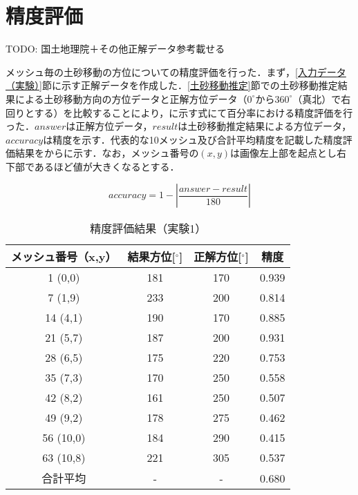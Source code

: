   \section{精度評価}
  TODO: 国土地理院＋その他正解データ参考載せる

    メッシュ毎の土砂移動の方位についての精度評価を行った．まず，\ref{入力データ（実験）}節に示す正解データを作成した．\ref{土砂移動推定}節での土砂移動推定結果による土砂移動方向の方位データと正解方位データ（$0^\circ$から$360^\circ$（真北）で右回りとする）を比較することにより，に示す式にて百分率における精度評価を行った．$answer$は正解方位データ，$result$は土砂移動推定結果による方位データ，$accuracy$は精度を示す．代表的な10メッシュ及び合計平均精度を記載した精度評価結果をからに示す．なお，メッシュ番号の$(x,y)$は画像左上部を起点とし右下部であるほど値が大きくなるとする．

    \begin{equation}
      \label{精度評価}
      accuracy = 1 - |\dfrac{answer - result} {180}|
    \end{equation}

    \begin{table}[tbp]
      \centering
      \caption{精度評価結果（実験1）}
      \label{精度評価結果（実験1）}
      \begin{tabular}{cccc}
        \hline
        \textbf{メッシュ番号（x,y）} & \textbf{結果方位[$^{\circ}$]} & \textbf{正解方位[$^{\circ}$]} & \textbf{精度} \\
        \hline  \hline
        1 (0,0) & 181 & 170 & 0.939 \\
        7 (1,9) & 233 & 200 & 0.814 \\
        14 (4,1) & 190 & 170 & 0.885 \\
        21 (5,7) & 187 & 200 & 0.931 \\
        28 (6,5) & 175 & 220 & 0.753 \\
        35 (7,3) & 170 & 250 & 0.558 \\
        42 (8,2) & 161 & 250 & 0.507 \\
        49 (9,2) & 178 & 275 & 0.462 \\
        56 (10,0) & 184 & 290 & 0.415 \\
        63 (10,8) & 221 & 305 & 0.537 \\
        合計平均 & - & - & 0.680 \\
        \hline
      \end{tabular}
    \end{table}

